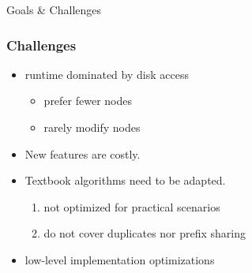 \documentclass{beamer}
\begin{document}
\begin{section}{Goals \& Challenges}
    \begin{frame}
      \frametitle{Challenges}
        \begin{itemize}
          \item runtime dominated by disk access
          \pause
          \begin{itemize}
            \item prefer fewer nodes
            \pause
            \item rarely modify nodes
          \end{itemize}
          \pause
          \item New features are costly.
          \pause
          \item Textbook algorithms need to be adapted.
          \pause
          \begin{enumerate}
            \item not optimized for practical scenarios
            \pause
            \item do not cover duplicates nor prefix sharing
          \end{enumerate}
          \pause
          \item low-level implementation optimizations
        \end{itemize}
    \end{frame}
  \end{section}
\end{document}
